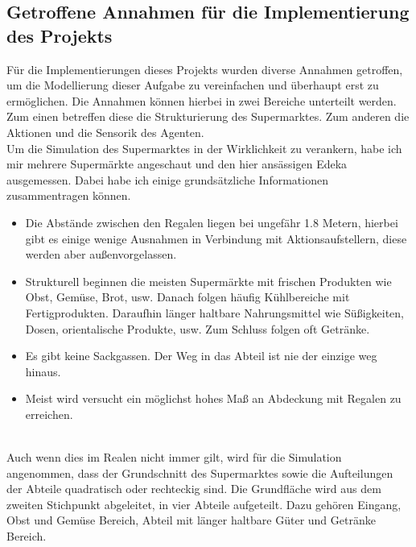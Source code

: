 \subsection{Getroffene Annahmen für die Implementierung des Projekts}
\label{annahmen}
Für die Implementierungen dieses Projekts wurden diverse Annahmen getroffen, um die Modellierung dieser Aufgabe zu vereinfachen und überhaupt erst zu ermöglichen. Die Annahmen können hierbei in zwei Bereiche unterteilt werden. Zum einen betreffen diese die Strukturierung des Supermarktes. Zum anderen die Aktionen und die Sensorik des Agenten.
\\
Um die Simulation des Supermarktes in der Wirklichkeit zu verankern, habe ich mir mehrere Supermärkte angeschaut und den hier ansässigen Edeka ausgemessen. Dabei habe ich einige grundsätzliche Informationen zusammentragen können. 
\\
\begin{itemize}
	\item Die Abstände zwischen den Regalen liegen bei ungefähr 1.8 Metern, hierbei gibt es einige wenige Ausnahmen in Verbindung mit Aktionsaufstellern, diese werden aber außenvorgelassen.
	\item Strukturell beginnen die meisten Supermärkte mit frischen Produkten wie Obst, Gemüse, Brot, usw. Danach folgen häufig Kühlbereiche mit Fertigprodukten. Daraufhin länger haltbare Nahrungsmittel wie Süßigkeiten, Dosen, orientalische Produkte, usw. Zum Schluss folgen oft Getränke.
	\item Es gibt keine Sackgassen. Der Weg in das Abteil ist nie der einzige weg hinaus.
	\item Meist wird versucht ein möglichst hohes Maß an Abdeckung mit Regalen zu erreichen.
\end{itemize}
\noindent
\\
Auch wenn dies im Realen nicht immer gilt, wird für die Simulation angenommen, dass der Grundschnitt des Supermarktes sowie die Aufteilungen der Abteile quadratisch oder rechteckig sind. Die Grundfläche wird aus dem zweiten Stichpunkt abgeleitet, in vier Abteile aufgeteilt. Dazu gehören Eingang, Obst und Gemüse Bereich, Abteil mit länger haltbare Güter und Getränke Bereich. 
\\
